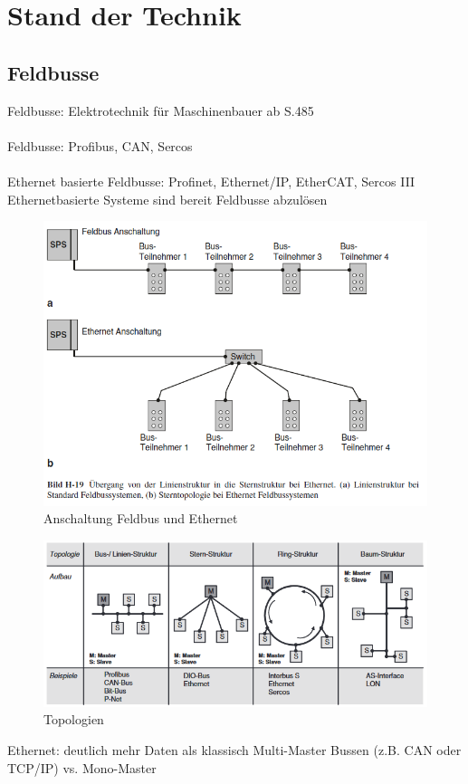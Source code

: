 \documentclass[ a4paper,
                oneside,
                toc=bibliography,
                toc=listof
                ]{scrbook}
\begin{document}
	\chapter{Stand der Technik}
	
	\section{Feldbusse}
	Feldbusse: Elektrotechnik für Maschinenbauer ab S.485\\
	\\
	Feldbusse: Profibus, CAN, Sercos
	\\
	\\	
	Ethernet basierte Feldbusse: Profinet, Ethernet/IP, EtherCAT, Sercos III
	Ethernetbasierte Systeme sind bereit Feldbusse abzulösen
	
	\begin{figure}[h]
		\centering
		\includegraphics[width=1.0\linewidth]{./images/Feldbus vs Ethernet Anschaltung.png}
		\caption{Anschaltung Feldbus und Ethernet \cite{hering2012elektrotechnik}}
		\label{fig:Anschaltung Bus}
	\end{figure}
	
	\begin{figure}[h]
		\centering
		\includegraphics[width=1.0\linewidth]{./images/Topologien.png}
		\caption{Topologien}
		\label{fig:Topologien}
	\end{figure}
	Ethernet: deutlich mehr Daten als klassisch
	Multi-Master Bussen (z.B. CAN oder TCP/IP) vs. Mono-Master
	
\end{document}
